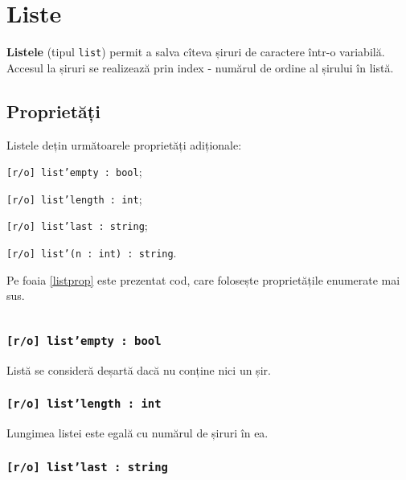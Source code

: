 \section{Liste}

{\bf Listele} (tipul \texttt{list}) permit a salva cîteva șiruri de caractere într-o variabilă. Accesul la șiruri se realizează prin index - numărul de ordine al șirului în listă.

\subsection{Proprietăți}

Listele dețin următoarele proprietăți adiționale:
\begin{icItems}
\item
	\texttt{[r/o] list'empty : bool};
\item
	\texttt{[r/o] list'length : int};
\item
	\texttt{[r/o] list'last : string};
\item
	\texttt{[r/o] list'(n : int) : string}.
\end{icItems}

Pe foaia \ref{listprop} este prezentat cod, care folosește proprietățile enumerate mai sus.

\begin{sourcecode}
    \label{listprop}
    \inputminted[linenos]{icl}{../sources/listprop.icL}
\end{sourcecode}

\subsubsection{\texttt{[r/o] list'empty : bool}}

Listă se consideră deșartă dacă nu conține nici un șir.

\subsubsection{\texttt{[r/o] list'length : int}}

Lungimea listei este egală cu numărul de șiruri în ea.

\subsubsection{\texttt{[r/o] list'last : string}}

